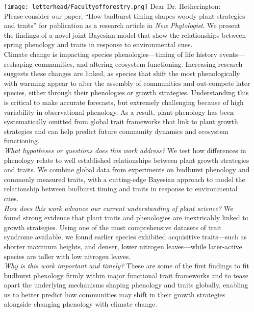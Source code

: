 \documentclass[11pt,a4paper]{article}
\begin{document}

\noindent \texttt{[image: letterhead/Facultyofforestry.png]}
\noindent Dear Dr. Hetherington:
\vspace{1.5ex}\\
\noindent Please consider our paper, ``How budburst timing shapes woody plant strategies and traits'' for publication as a research article in \emph{New Phytologist}. We present the findings of a novel joint Bayesian model  that show the relationships between spring phenology and traits in response to environmental cues.
\vspace{1.5ex}\\ 
\noindent Climate change is impacting species phenologies---timing of life history events---reshaping communities, and altering ecosystem functioning. Increasing research suggests these changes are linked, as species that shift the most phenologically with warming appear to alter the assembly of communities and out-compete later species, either through their phenologies or growth strategies. Understanding this is critical to make accurate forecasts, but extremely challenging because of high variability in observational phenology. As a result, plant phenology has been systematically omitted from global trait frameworks that link to plant growth strategies and can help predict future community dynamics and ecosystem functioning.
\vspace{1.5ex}\\
\emph{What hypotheses or questions does this work address?} We test how differences in phenology relate to well established relationships between plant growth strategies and traits. We combine global data from experiments on budburst phenology and commonly measured traits, with a cutting-edge Bayesian approach to model the relationship between budburst timing and traits in response to environmental cues.  %
\vspace{1.5ex}\\
\emph{How does this work advance our current understanding of plant science?} We found strong evidence that plant traits and phenologies are inextricably linked to growth strategies. Using one of the most comprehensive datasets of trait syndrome available, we found earlier species exhibited acquisitive traits---such as shorter maximum heights, and denser, lower nitrogen leaves---while later-active species are taller with low nitrogen leaves.
\vspace{1.5ex}\\
\emph{Why is this work important and timely?} These are some of the first findings to fit budburst phenology firmly within major functional trait frameworks and to tease apart the underlying mechanisms shaping phenology and traits globally, enabling us to better predict how communities may shift in their growth strategies alongside changing phenology with climate change. 
\end{document}
